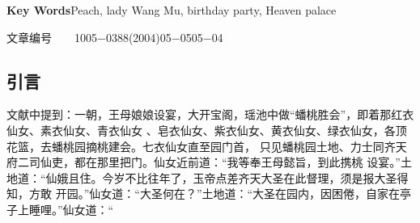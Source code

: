 \documentclass[a4paper,11pt,onecolumn,twoside]{article}
\begin{document}
\begin{CJK}{UTF8}{gbsn}
\begin{center}
{{{						\textbf{Key Words}\quad Peach, lady Wang Mu, birthday party, Heaven palace}}
			}
		\end{center}
		\begin{minipage}[c]{10cm}
			\vspace{-35.5cm}
			文章编号~~~~1005$-$0388(2004)05$-$0505$-$04
		\end{minipage}
		\setlength{\oddsidemargin}{-.5cm}  %
		\setlength{\evensidemargin}{\oddsidemargin}
		\setlength{\textwidth}{17.00cm}
		\begin{multicols}{2}
			\section{引言}
			文献\supercite{Wu,Xuan}中提到：一朝，王母娘娘设宴，大开宝阁，瑶池中做“蟠桃胜会”，即着那红衣仙女、素衣仙女、青衣仙女
			、皂衣仙女、紫衣仙女、黄衣仙女、绿衣仙女，各顶花篮，去蟠桃园摘桃建会。七衣仙女直至园门首，
			只见蟠桃园土地、力士同齐天府二司仙吏，都在那里把门。仙女近前道：“我等奉王母懿旨，到此携桃
			设宴。”土地道：“仙娥且住。今岁不比往年了，玉帝点差齐天大圣在此督理，须是报大圣得知，方敢
			开园。”仙女道：“大圣何在？”土地道：“大圣在园内，因困倦，自家在亭子上睡哩。”仙女道：“
			

\end{multicols}
\end{CJK}
\end{document}
